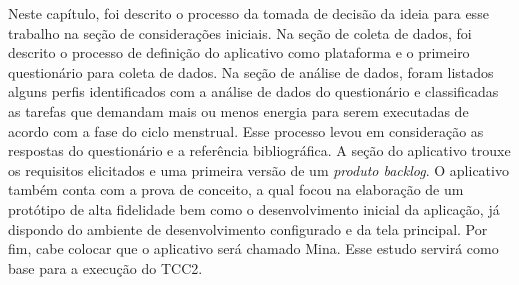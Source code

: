 Neste capítulo, foi descrito o processo da tomada de decisão 
da ideia para 
esse trabalho na seção de considerações iniciais. Na seção 
de coleta de dados, 
foi descrito o processo de definição do aplicativo como 
plataforma e o primeiro questionário 
para coleta de dados. Na seção de análise de dados, foram 
listados alguns perfis identificados 
com a análise de dados do questionário e classificadas as 
tarefas que demandam mais ou menos energia 
para serem executadas de acordo com a fase do ciclo menstrual. 
Esse processo levou em consideração 
as respostas do questionário e a referência bibliográfica. 
A seção do aplicativo trouxe os requisitos elicitados e 
uma primeira versão de um \emph{produto backlog}. O aplicativo também conta 
com a prova de conceito, a qual focou na elaboração de um protótipo de alta fidelidade 
bem como o desenvolvimento 
inicial 
da aplicação, já dispondo do ambiente de desenvolvimento configurado e da tela 
principal. Por fim, cabe colocar que o aplicativo será chamado Mina. Esse estudo servirá como base para a execução 
do TCC2.